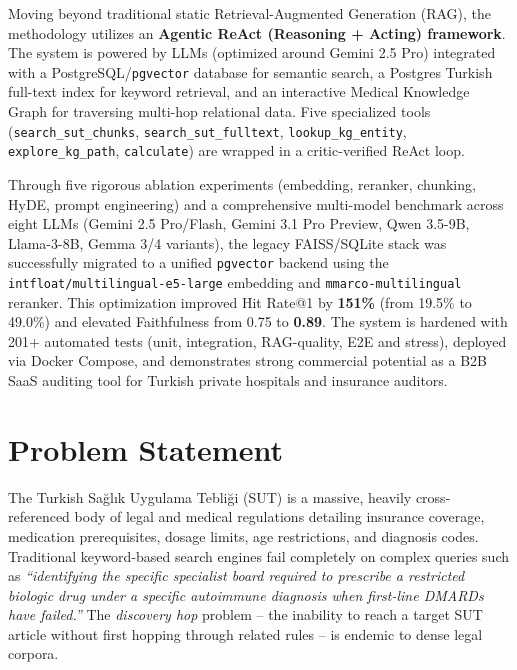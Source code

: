 \documentclass[11pt, a4paper]{article}
\begin{document}
Moving beyond traditional static Retrieval-Augmented Generation (RAG), the methodology utilizes an \textbf{Agentic ReAct (Reasoning + Acting) framework}. The system is powered by LLMs (optimized around Gemini 2.5 Pro) integrated with a PostgreSQL/\texttt{pgvector} database for semantic search, a Postgres Turkish full-text index for keyword retrieval, and an interactive Medical Knowledge Graph for traversing multi-hop relational data. Five specialized tools (\texttt{search\_sut\_chunks}, \texttt{search\_sut\_fulltext}, \texttt{lookup\_kg\_entity}, \texttt{explore\_kg\_path}, \texttt{calculate}) are wrapped in a critic-verified ReAct loop.

Through five rigorous ablation experiments (embedding, reranker, chunking, HyDE, prompt engineering) and a comprehensive multi-model benchmark across eight LLMs (Gemini 2.5 Pro/Flash, Gemini 3.1 Pro Preview, Qwen 3.5-9B, Llama-3-8B, Gemma 3/4 variants), the legacy FAISS/SQLite stack was successfully migrated to a unified \texttt{pgvector} backend using the \texttt{intfloat/multilingual-e5-large} embedding and \texttt{mmarco-multilingual} reranker. This optimization improved Hit Rate@1 by \textbf{151\%} (from 19.5\% to 49.0\%) and elevated Faithfulness from 0.75 to \textbf{0.89}. The system is hardened with 201+ automated tests (unit, integration, RAG-quality, E2E and stress), deployed via Docker Compose, and demonstrates strong commercial potential as a B2B SaaS auditing tool for Turkish private hospitals and insurance auditors.

\section{Problem Statement}

The Turkish Sağlık Uygulama Tebliği (SUT) is a massive, heavily cross-referenced body of legal and medical regulations detailing insurance coverage, medication prerequisites, dosage limits, age restrictions, and diagnosis codes. Traditional keyword-based search engines fail completely on complex queries such as \textit{``identifying the specific specialist board required to prescribe a restricted biologic drug under a specific autoimmune diagnosis when first-line DMARDs have failed.''} The \textit{discovery hop} problem -- the inability to reach a target SUT article without first hopping through related rules -- is endemic to dense legal corpora.
\end{document}
